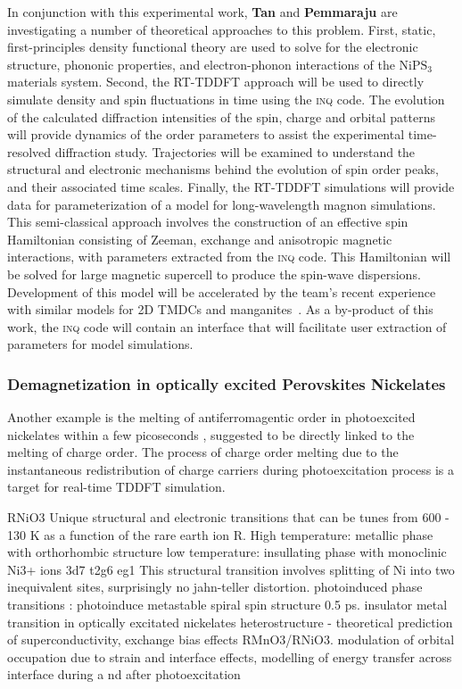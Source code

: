 In conjunction with this experimental work, {\bf Tan} and {\bf Pemmaraju} are investigating a number of theoretical approaches to this problem.
First, static, first-principles density functional theory are used to solve for the electronic structure, phononic properties, and electron-phonon interactions of the \(\mathrm{NiPS_3}\) materials system. 
Second, the RT-TDDFT approach will be used to directly simulate density and spin fluctuations in time using the \textsc{inq} code.
The evolution of the calculated diffraction intensities of the spin, charge and orbital patterns will provide dynamics of the order parameters to assist the experimental time-resolved diffraction study.
Trajectories will be examined to understand the structural and electronic mechanisms behind the evolution of spin order peaks, and their associated time scales. 
Finally, the RT-TDDFT simulations will provide data for parameterization of a model for long-wavelength magnon simulations. 
This semi-classical approach involves the construction of an effective spin Hamiltonian consisting of Zeeman, exchange and anisotropic magnetic interactions, with parameters extracted from the \textsc{inq} code. 
This Hamiltonian will be solved for large magnetic supercell to produce the spin-wave dispersions. 
Development of this model will be accelerated by the team's recent experience with similar models for 2D TMDCs and manganites~\cite{Siddiqui2020, Rajpurohit2020}. 
As a by-product of this work, the \textsc{inq} code will contain an interface that will facilitate user extraction of parameters for model simulations.

\subsubsection{Demagnetization in optically excited Perovskites Nickelates}
Another example is the melting of antiferromagentic order in
photoexcited nickelates within a few picoseconds \cite{Caviglia2013}, suggested to be
directly linked to the melting of charge order.
The process of charge order melting due to the instantaneous 
redistribution of charge carriers during photoexcitation process is a target for real-time TDDFT simulation.

RNiO3
Unique structural and electronic transitions that can be tunes from 600 - 130 K as a function of the rare earth ion R.
High temperature: metallic phase with orthorhombic structure
low temperature: insullating phase with monoclinic
Ni3+ ions 3d7 t2g6 eg1
This structural transition involves splitting of Ni into two inequivalent sites, surprisingly no jahn-teller distortion.
photoinduced phase transitions : photoinduce metastable spiral spin structure 0.5 ps. insulator metal transition in optically excitated nickelates
heterostructure - theoretical prediction of superconductivity, exchange bias effects RMnO3/RNiO3. modulation of orbital occupation due to strain and interface effects, modelling of energy transfer across interface during a nd after photoexcitation
